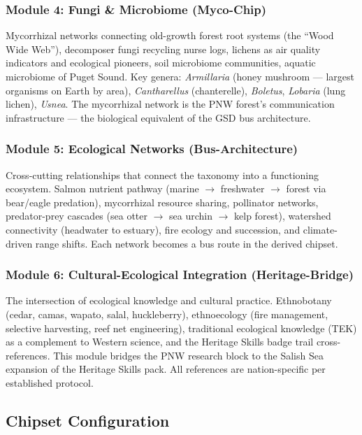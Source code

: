 \documentclass[11pt,letterpaper]{article}
\begin{document}
\subsubsection{Module 4: Fungi \& Microbiome (Myco-Chip)}

Mycorrhizal networks connecting old-growth forest root systems (the ``Wood Wide Web''), decomposer fungi recycling nurse logs, lichens as air quality indicators and ecological pioneers, soil microbiome communities, aquatic microbiome of Puget Sound. Key genera: \emph{Armillaria} (honey mushroom --- largest organisms on Earth by area), \emph{Cantharellus} (chanterelle), \emph{Boletus}, \emph{Lobaria} (lung lichen), \emph{Usnea}. The mycorrhizal network is the PNW forest's communication infrastructure --- the biological equivalent of the GSD bus architecture.

\subsubsection{Module 5: Ecological Networks (Bus-Architecture)}

Cross-cutting relationships that connect the taxonomy into a functioning ecosystem. Salmon nutrient pathway (marine $\rightarrow$ freshwater $\rightarrow$ forest via bear/eagle predation), mycorrhizal resource sharing, pollinator networks, predator-prey cascades (sea otter $\rightarrow$ sea urchin $\rightarrow$ kelp forest), watershed connectivity (headwater to estuary), fire ecology and succession, and climate-driven range shifts. Each network becomes a bus route in the derived chipset.

\subsubsection{Module 6: Cultural-Ecological Integration (Heritage-Bridge)}

The intersection of ecological knowledge and cultural practice. Ethnobotany (cedar, camas, wapato, salal, huckleberry), ethnoecology (fire management, selective harvesting, reef net engineering), traditional ecological knowledge (TEK) as a complement to Western science, and the Heritage Skills badge trail cross-references. This module bridges the PNW research block to the Salish Sea expansion of the Heritage Skills pack. All references are nation-specific per established protocol.

\subsection{Chipset Configuration}
\end{document}
